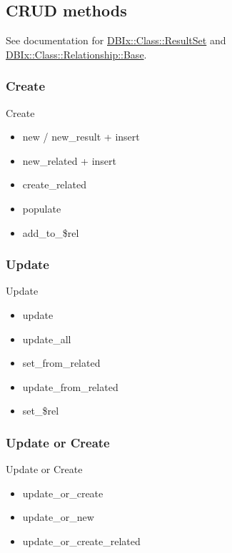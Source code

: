 \subsection{CRUD methods}

See documentation for 
\href{https://metacpan.org/pod/DBIx::Class::ResultSet}{DBIx::Class::ResultSet} 
and \href{https://metacpan.org/pod/DBIx::Class::Relationship::Base}
{DBIx::Class::Relationship::Base}.

\subsubsection{Create}

\begin{frame}{Create}
\begin{itemize}
\item new / new\_result + insert
\item new\_related + insert
\item create\_related
\item populate
\item add\_to\_\$rel
\end{itemize}
\end{frame}

\subsubsection{Update}

\begin{frame}{Update}
\begin{itemize}
\item update
\item update\_all
\item set\_from\_related
\item update\_from\_related
\item set\_\$rel
\end{itemize}
\end{frame}

\subsubsection{Update or Create}

\begin{frame}{Update or Create}
\begin{itemize}
\item update\_or\_create
\item update\_or\_new
\item update\_or\_create\_related
\end{itemize}
\end{frame}

